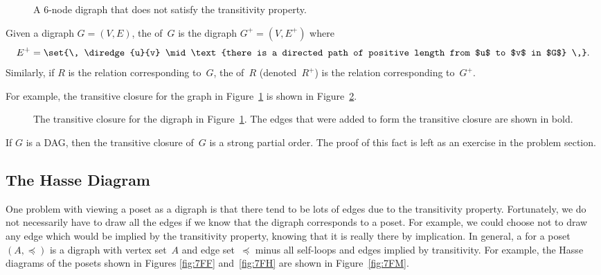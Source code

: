 \begin{figure}


\caption{A 6-node digraph that does not satisfy the transitivity
  property.}

\label{fig:7FJ}

\end{figure}

\begin{definition}\label{def:transitive_closure}
Given a digraph $G = (V, E)$, the  of~$G$ is
the digraph $G^+ = (V, E^+)$ where
\begin{equation*}
    E^+ = \set{\, \diredge{u}{v} \mid \text{there is a directed path of
        positive length from $u$ to $v$ in $G$} \,}.
\end{equation*}
Similarly, if $R$ is the relation corresponding to~$G$, the
 of~$R$ (denoted~$R^+$) is the relation
corresponding to~$G^+$.
\end{definition}

For example, the transitive closure for the graph in
Figure~\ref{fig:7FJ} is shown in Figure~\ref{fig:7FK}.

\begin{figure}


\caption{The transitive closure for the digraph in
  Figure~\ref{fig:7FJ}.  The edges that were added to form the
  transitive closure are shown in bold.}

\label{fig:7FK}

\end{figure}

If $G$ is a DAG, then the transitive closure of~$G$ is a strong
partial order.  The proof of this fact is left as an exercise in the
problem section.

\subsection{The Hasse Diagram}

One problem with viewing a poset as a digraph is that there tend to be
lots of edges due to the transitivity property.  Fortunately, we do
not necessarily have to draw all the edges if we know that the digraph
corresponds to a poset.  For example, we could choose not to draw any
edge which would be implied by the transitivity property, knowing that
it is really there by implication.  In general, a 
for a poset~$(A, \preceq)$ is a digraph with vertex set~$A$ and edge
set~$\preceq$ minus all self-loops and edges implied by transitivity.
For example, the Hasse diagrams of the posets shown in Figures
\ref{fig:7FF} and~\ref{fig:7FH} are shown in Figure~\ref{fig:7FM}.

